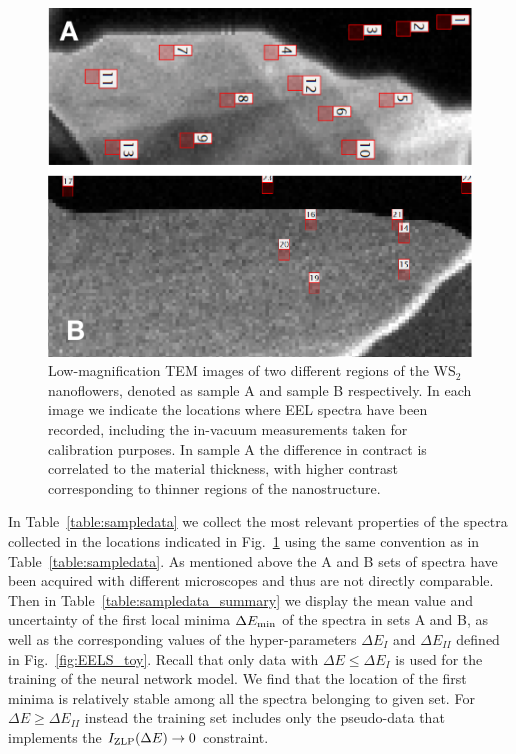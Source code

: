 \begin{figure}[t]
\begin{centering}
  \includegraphics[width=0.87\linewidth]{plots/Spectra_location.pdf}
  \caption{Low-magnification TEM images of two different regions of
    the WS$_2$ nanoflowers, denoted as sample A and sample B respectively.
    In each image we indicate the locations where
    EEL spectra have been recorded, including the in-vacuum measurements taken
    for calibration purposes.
    In sample A the difference in contract is correlated to the material
    thickness, with higher contrast corresponding to thinner regions of the nanostructure.
  }
\label{fig:ws2positions}
\end{centering}
\end{figure}

In Table~\ref{table:sampledata} we collect the most relevant properties of the spectra collected
in the locations indicated in Fig.~\ref{fig:ws2positions} using the same convention as
in Table~\ref{table:sampledata}.
%
As mentioned above the A and B sets of spectra have been acquired with different microscopes and thus are
not directly comparable.
%
Then in Table~\ref{table:sampledata_summary} we display
the mean value and uncertainty of the first local minima $\Delta E_{\rm min}$
    of the spectra in sets A and B, as well as the corresponding values of the hyper-parameters
    $\Delta E_I$ and $\Delta E_{II}$ defined in Fig.~\ref{fig:EELS_toy}.
    Recall that only data with $\Delta E \le \Delta E_I$ is used for the training
    of the neural network model.
    We find that the location of the first minima is relatively stable
    among all the spectra belonging to given set.
    For $\Delta E \ge \Delta E_{II}$ instead the training set includes only the pseudo-data
    that implements the $I_{\rm ZLP}(\Delta E)\to 0$ constraint.

